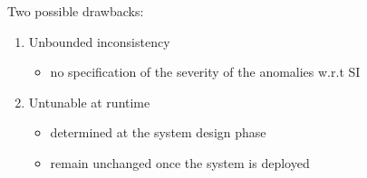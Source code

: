 \begin{frame}{}
  Two possible drawbacks:
  \begin{enumerate}
    \setlength{\itemsep}{8pt}
    \item Unbounded inconsistency
      \begin{itemize}
	\item no specification of the severity of the anomalies w.r.t SI
      \end{itemize}
    \pause
    \item Untunable at runtime
      \begin{itemize}
	\setlength{\itemsep}{5pt}
	\item determined at the system design phase
	\item remain unchanged once the system is deployed
      \end{itemize}
  \end{enumerate}
\end{frame}

